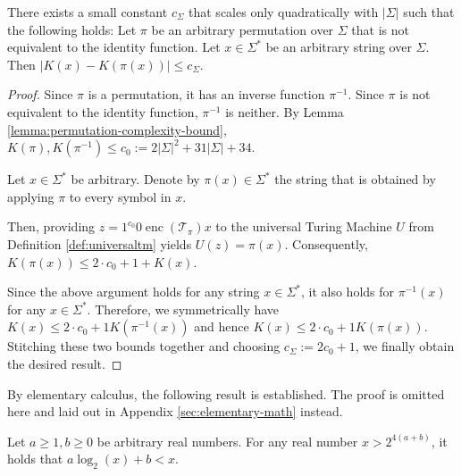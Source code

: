 \begin{theorem}
	There exists a small constant $c_{\Sigma}$ that scales only quadratically with $|\Sigma|$ such that the following holds:
	Let $\pi$ be an arbitrary permutation over $\Sigma$ that is not equivalent to the identity function. 
	Let $x\in\Sigma^{*}$ be an arbitrary string over $\Sigma$.
	Then $|K(x)-K(\pi(x))|\leq c_{\Sigma}$.
\end{theorem}
\begin{proof}
	Since $\pi$ is a permutation, it has an inverse function $\pi^{-1}$.
	Since $\pi$ is not equivalent to the identity function, $\pi^{-1}$ is neither.
	By Lemma \ref{lemma:permutation-complexity-bound}, $K(\pi),K(\pi^{-1})\leq c_{0}:=2|\Sigma|^2+31|\Sigma|+34$.
	
	Let $x\in\Sigma^{*}$ be arbitrary. Denote by $\pi(x)\in\Sigma^{*}$ the string that is obtained by applying $\pi$ to every symbol in $x$.
	
	Then, providing $z=1^{c_{0}}0 \operatorname{enc}(\mathcal{T}_\pi) x$ to the universal Turing Machine $U$ from Definition \ref{def:universaltm} yields $U(z)=\pi(x)$.
	Consequently, $K(\pi(x))\leq 2\cdot c_0+1+K(x)$.
	
	Since the above argument holds for any string $x\in\Sigma^{*}$, it also holds for $\pi^{-1}(x)$ for any $x\in\Sigma^{*}$.
	Therefore, we symmetrically have $K(x)\leq 2\cdot c_0+1 K(\pi^{-1}(x))$ and hence $K(x)\leq 2\cdot c_0+1 K(\pi(x))$.
	Stitching these two bounds together and choosing $c_\Sigma:=2c_0+1$, we finally obtain the desired result.
\end{proof}

%
%
%
%
%
%
%
%


By elementary calculus, the following result is established. The proof is omitted here and laid out in Appendix \ref{sec:elementary-math} instead.
\begin{lemma}
	\label{lemma:log-lin-add-inequality-placeholder}
	Let $a\geq 1,b\geq 0$ be arbitrary real numbers.
	For any real number $x > 2^{4(a+b)}$, it holds that $a\log_2(x)+b < x$.
\end{lemma}

